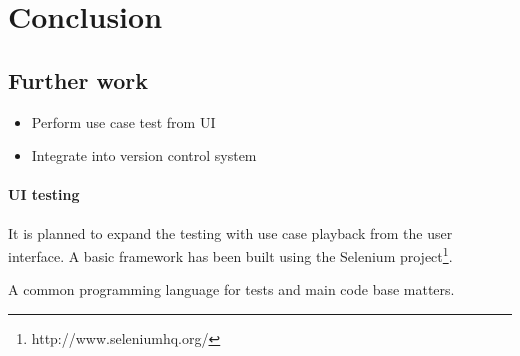 \chapter{Conclusion}

\section{Further work}
\begin{itemize}
  \item Perform use case test from UI
  \item Integrate into version control system
\end{itemize}
\subsubsection{UI testing}
It is planned to expand the testing with use case playback from the user interface. A basic framework has been built using the Selenium project\footnote{http://www.seleniumhq.org/}.


A common programming language for tests and main code base matters.

